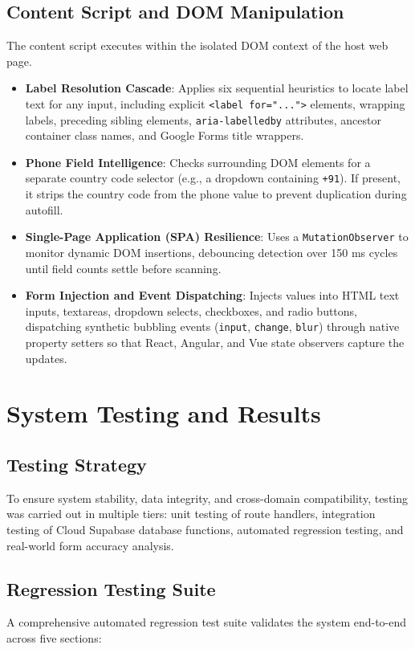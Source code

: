 \documentclass[12pt,a4paper]{report}
\begin{document}
\section{Content Script and DOM Manipulation}
The content script executes within the isolated DOM context of the host web page.
\begin{itemize}
    \item \textbf{Label Resolution Cascade}: Applies six sequential heuristics to locate label text for any input, including explicit \texttt{<label for="...">} elements, wrapping labels, preceding sibling elements, \texttt{aria-labelledby} attributes, ancestor container class names, and Google Forms title wrappers.
    \item \textbf{Phone Field Intelligence}: Checks surrounding DOM elements for a separate country code selector (e.g., a dropdown containing \texttt{+91}). If present, it strips the country code from the phone value to prevent duplication during autofill.
    \item \textbf{Single-Page Application (SPA) Resilience}: Uses a \texttt{MutationObserver} to monitor dynamic DOM insertions, debouncing detection over 150 ms cycles until field counts settle before scanning.
    \item \textbf{Form Injection and Event Dispatching}: Injects values into HTML text inputs, textareas, dropdown selects, checkboxes, and radio buttons, dispatching synthetic bubbling events (\texttt{input}, \texttt{change}, \texttt{blur}) through native property setters so that React, Angular, and Vue state observers capture the updates.
\end{itemize}

\chapter{System Testing and Results}

\section{Testing Strategy}
To ensure system stability, data integrity, and cross-domain compatibility, testing was carried out in multiple tiers: unit testing of route handlers, integration testing of Cloud Supabase database functions, automated regression testing, and real-world form accuracy analysis.

\section{Regression Testing Suite}
A comprehensive automated regression test suite validates the system end-to-end across five sections:
\end{document}
